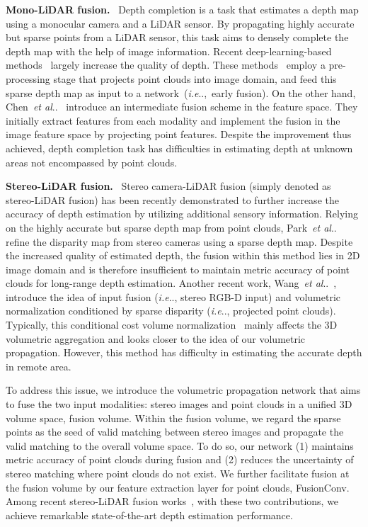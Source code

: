\documentclass[letterpaper, 10 pt, conference]{ieeeconf}
\makeatletter
\DeclareRobustCommand\onedot{\futurelet\@let@token\@onedot}
\def\@onedot{\ifx\@let@token.\else.\null\fi\xspace}
\def\ie{\emph{i.e}\onedot} \def\Ie{{I.e}\onedot}
\def\etal{\emph{et al}\onedot}
\makeatother
\begin{document}
\vspace{1mm} \noindent \textbf{Mono-LiDAR fusion.} \ 
Depth completion is a task that estimates a depth map using a monocular camera and a LiDAR sensor. By propagating highly accurate but sparse points from a LiDAR sensor, this task aims to densely complete the depth map with the help of image information. Recent deep-learning-based  methods~\cite{guidenet,sparse-to-dense,2D-3D-fusion-depth-completion,jinsunpark} largely increase the quality of depth. These methods~\cite{guidenet,sparse-to-dense,jinsunpark} employ a pre-processing stage that projects point clouds into image domain, and feed this sparse depth map as input to a network~(\ie,~early fusion). On the other hand, Chen~\etal~\cite{2D-3D-fusion-depth-completion} introduce an intermediate fusion scheme in the feature space. They initially extract features from each modality and implement the fusion in the image feature space by projecting point features. Despite the improvement thus achieved, depth completion task has difficulties in estimating depth at unknown areas not encompassed by point clouds.

\vspace{1mm} \noindent \textbf{Stereo-LiDAR fusion.} \ 
Stereo camera-LiDAR fusion (simply denoted as stereo-LiDAR fusion) has been recently demonstrated to further increase the accuracy of depth estimation by utilizing additional sensory information. Relying on the highly accurate but sparse depth map from point clouds,
Park~\etal~\cite{stereolidar_00} refine the disparity map from stereo cameras using a sparse depth map. Despite the increased quality of estimated depth, the fusion within this method lies in 2D image domain and is therefore insufficient to maintain metric accuracy of point clouds for long-range depth estimation. Another recent work, Wang~\etal~\cite{stereolidar_norm_costV_ccvn}, introduce the idea of input fusion (\ie, stereo RGB-D input) and volumetric normalization conditioned by sparse disparity (\ie, projected point clouds). Typically, this conditional cost volume normalization~\cite{stereolidar_norm_costV_ccvn} mainly affects the 3D volumetric aggregation and looks closer to the idea of our volumetric propagation. However, this method has difficulty in estimating the accurate depth in remote area.

To address this issue, we introduce the volumetric propagation network that aims to fuse the two input modalities: stereo images and point clouds in a unified 3D volume space, fusion volume. Within the fusion volume, we regard the sparse points as the seed of valid matching between stereo images and propagate the valid matching to the overall volume space. To do so, our network (1) maintains metric accuracy of point clouds during fusion and (2) reduces the uncertainty of stereo matching where point clouds do not exist. We further facilitate fusion at the fusion volume by our feature extraction layer for point clouds, FusionConv. Among recent stereo-LiDAR fusion works~\cite{stereolidar_01,stereolidar_00,stereolidar_norm_costV_ccvn}, with these two contributions, we achieve remarkable state-of-the-art depth estimation performance.
\end{document}
